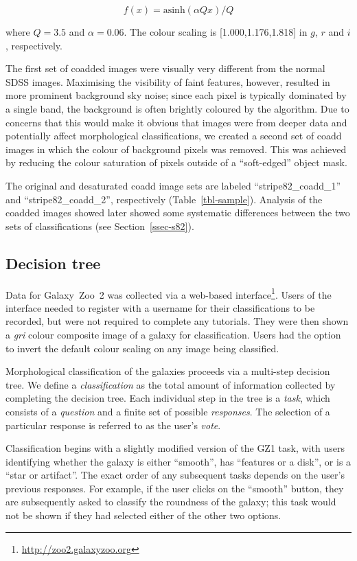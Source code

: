 \documentclass[useAMS,usenatbib]{mn2e}
\begin{document}
\begin{equation}
f(x)=\text{asinh}(\alpha Q x)/Q
\label{eqn-imagegen}
\end{equation}

\noindent where $Q=3.5$ and $\alpha=0.06$. The colour scaling is [1.000,1.176,1.818] in $g$, $r$ and $i$, respectively. 

The first set of coadded images were visually very different from the normal SDSS images. Maximising the visibility of faint features, however, resulted in more prominent background sky noise; since each pixel is typically dominated by a single band, the background is often brightly coloured by the \citet{lup04} algorithm. Due to concerns that this would make it obvious that images were from deeper data and potentially affect morphological classifications, we created a second set of coadd images in which the colour of background pixels was removed. This was achieved by reducing the colour saturation of pixels outside of a ``soft-edged'' object mask. 

The original and desaturated coadd image sets are labeled ``stripe82\_coadd\_1'' and ``stripe82\_coadd\_2'', respectively (Table~\ref{tbl-sample}). Analysis of the coadded images showed later showed some systematic differences between the two sets of classifications (see Section~\ref{ssec-s82}). 

\subsection{Decision tree}\label{ssec-decision_tree}

Data for Galaxy~Zoo~2 was collected via a web-based interface\footnote{\url{http://zoo2.galaxyzoo.org}}. Users of the interface needed to register with a username for their classifications to be recorded, but were not required to complete any tutorials. They were then shown a {\it gri} colour composite image of a galaxy for classification. Users had the option to invert the default colour scaling on any image being classified. 

Morphological classification of the galaxies proceeds via a multi-step decision tree. We define a {\it classification} as the total amount of information collected by completing the decision tree. Each individual step in the tree is a {\it task}, which consists of a {\it question} and a finite set of possible {\it responses}. The selection of a particular response is referred to as the user's {\it vote}. 

Classification begins with a slightly modified version of the GZ1 task, with users identifying whether the galaxy is either ``smooth'', has ``features or a disk'', or is a ``star or artifact''. The exact order of any subsequent tasks depends on the user's previous responses. For example, if the user clicks on the ``smooth'' button, they are subsequently asked to classify the roundness of the galaxy; this task would not be shown if they had selected either of the other two options. 
\end{document}

